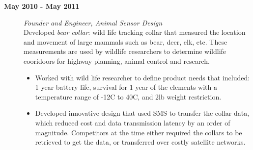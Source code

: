 \documentclass[letter]{article}
\begin{document}
\begin{description}
\begin{description}
		\item [\textbf{May 2010 - May 2011}] \emph{Founder and Engineer, Animal Sensor Design}
                \\
                Developed \emph{bear collar}: wild life tracking collar that measured the location and movement of large mammals such as bear, deer, elk, etc. These measurements are used by wildlife researchers to determine wildlife cooridoors for highway planning, animal control and research.
			\begin{itemize}
			\item Worked with wild life researcher to define product needs that included: 1 year battery life, survival for 1 year of the elements with a temperature range of -12C to 40C, and 2lb weight restriction.
			\item Developed innovative design that used SMS to transfer the collar data, which reduced cost and data transmission latency by an order of magnitude. Competitors at the time either required the collars to be retrieved to get the data, or transferred over costly satellite networks.
			\end{itemize}


\end{description}
\end{description}
\end{document}
